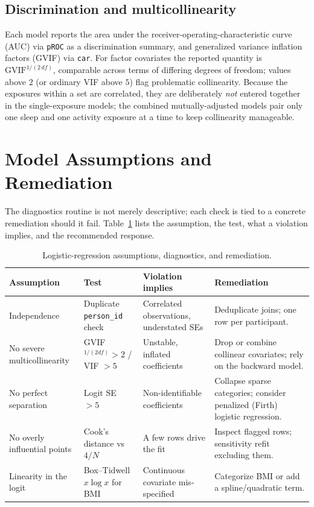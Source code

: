\documentclass[11pt]{article}
\newcommand{\code}[1]{\texttt{\small #1}}
\begin{document}
\subsection{Discrimination and multicollinearity}
Each model reports the area under the receiver-operating-characteristic curve (AUC) via \code{pROC} as
a discrimination summary, and generalized variance inflation factors (GVIF) via \code{car}. For factor
covariates the reported quantity is $\text{GVIF}^{1/(2\,df)}$, comparable across terms of differing
degrees of freedom; values above $2$ (or ordinary VIF above $5$) flag problematic collinearity. Because
the exposures within a set are correlated, they are deliberately \emph{not} entered together in the
single-exposure models; the combined mutually-adjusted models pair only one sleep and one activity
exposure at a time to keep collinearity manageable.

\section{Model Assumptions and Remediation}
The diagnostics routine is not merely descriptive; each check is tied to a concrete remediation should
it fail. Table~\ref{tab:assump} lists the assumption, the test, what a violation implies, and the
recommended response.

\begin{table}[h]
\centering
\footnotesize
\begin{tabular}{@{}p{2.9cm}p{3.0cm}p{3.4cm}p{3.6cm}@{}}
\toprule
\textbf{Assumption} & \textbf{Test} & \textbf{Violation implies} & \textbf{Remediation} \\
\midrule
Independence & Duplicate \code{person_id} check & Correlated observations, understated SEs & Deduplicate joins; one row per participant. \\
No severe multicollinearity & GVIF$^{1/(2df)} > 2$ / VIF $> 5$ & Unstable, inflated coefficients & Drop or combine collinear covariates; rely on the backward model. \\
No perfect separation & Logit SE $> 5$ & Non-identifiable coefficients & Collapse sparse categories; consider penalized (Firth) logistic regression. \\
No overly influential points & Cook's distance vs $4/N$ & A few rows drive the fit & Inspect flagged rows; sensitivity refit excluding them. \\
Linearity in the logit & Box--Tidwell $x\log x$ for BMI & Continuous covariate mis-specified & Categorize BMI or add a spline/quadratic term. \\
\bottomrule
\end{tabular}
\caption{Logistic-regression assumptions, diagnostics, and remediation.}
\label{tab:assump}
\end{table}
\end{document}
